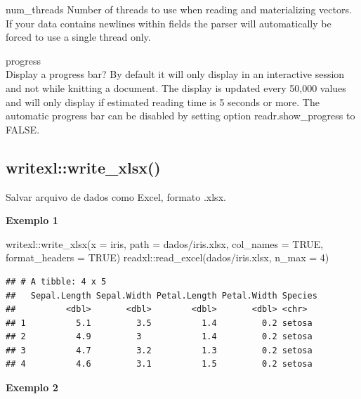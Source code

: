 \documentclass[
]{book}
\newenvironment{Shaded}{\begin{snugshade}}{\end{snugshade}}
\newcommand{\AttributeTok}[1]{\textcolor[rgb]{0.77,0.63,0.00}{#1}}
\newcommand{\ConstantTok}[1]{\textcolor[rgb]{0.00,0.00,0.00}{#1}}
\newcommand{\DecValTok}[1]{\textcolor[rgb]{0.00,0.00,0.81}{#1}}
\newcommand{\FunctionTok}[1]{\textcolor[rgb]{0.00,0.00,0.00}{#1}}
\newcommand{\NormalTok}[1]{#1}
\newcommand{\SpecialCharTok}[1]{\textcolor[rgb]{0.00,0.00,0.00}{#1}}
\newcommand{\StringTok}[1]{\textcolor[rgb]{0.31,0.60,0.02}{#1}}
\theoremstyle{definition}
\theoremstyle{definition}
\theoremstyle{definition}
\theoremstyle{definition}
\theoremstyle{remark}
\begin{document}
num\_threads
Number of threads to use when reading and materializing vectors. If your data contains newlines within fields the parser will automatically be forced to use a single thread only.

progress\\
Display a progress bar? By default it will only display in an interactive session and not while knitting a document. The display is updated every 50,000 values and will only display if estimated reading time is 5 seconds or more. The automatic progress bar can be disabled by setting option readr.show\_progress to FALSE.

\hypertarget{writexlwrite_xlsx}{%
\subsection{writexl::write\_xlsx()}\label{writexlwrite_xlsx}}

Salvar arquivo de dados como Excel, formato .xlsx.

\textbf{Exemplo 1}

\begin{Shaded}
\begin{Highlighting}[]
\NormalTok{writexl}\SpecialCharTok{::}\FunctionTok{write\_xlsx}\NormalTok{(}\AttributeTok{x =}\NormalTok{ iris,}
                    \AttributeTok{path =} \StringTok{\textquotesingle{}dados/iris.xlsx\textquotesingle{}}\NormalTok{,}
                    \AttributeTok{col\_names =} \ConstantTok{TRUE}\NormalTok{,}
                    \AttributeTok{format\_headers =} \ConstantTok{TRUE}\NormalTok{)}
\NormalTok{readxl}\SpecialCharTok{::}\FunctionTok{read\_excel}\NormalTok{(}\StringTok{\textquotesingle{}dados/iris.xlsx\textquotesingle{}}\NormalTok{, }\AttributeTok{n\_max =} \DecValTok{4}\NormalTok{)}
\end{Highlighting}
\end{Shaded}

\begin{verbatim}
## # A tibble: 4 x 5
##   Sepal.Length Sepal.Width Petal.Length Petal.Width Species
##          <dbl>       <dbl>        <dbl>       <dbl> <chr>  
## 1          5.1         3.5          1.4         0.2 setosa 
## 2          4.9         3            1.4         0.2 setosa 
## 3          4.7         3.2          1.3         0.2 setosa 
## 4          4.6         3.1          1.5         0.2 setosa
\end{verbatim}

\textbf{Exemplo 2}
\end{document}
